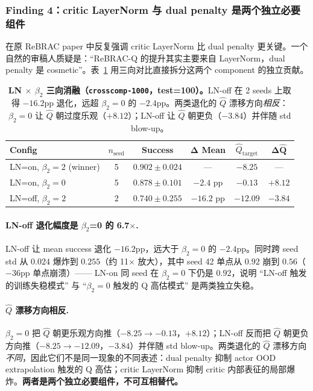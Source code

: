 \subsubsection{Finding 4：critic LayerNorm 与 dual penalty 是两个独立必要组件}
\label{subsubsec:finding_4}

\citet{tarasov2023rebrac} 在原 ReBRAC paper 中反复强调 critic LayerNorm 比 dual penalty 更关键。一个自然的审稿人质疑是：``ReBRAC-Q 的提升其实主要来自 LayerNorm，dual penalty 是 cosmetic''。表~\ref{tab:ln_ablation} 用三向对比直接拆分这两个 component 的独立贡献。

\begin{table}[t]
\centering
\small
\caption{\textbf{LN $\times$ $\beta_2$ 三向消融（\texttt{crosscomp-1000}，test=100）。}LN-off 在 2 seeds 上取得 $-16.2$pp 退化，远超 $\beta_2=0$ 的 $-2.4$pp。两类退化的 $\hat{Q}$ 漂移方向\emph{相反}：$\beta_2=0$ 让 $\hat{Q}$ 朝过度乐观（$+8.12$）；LN-off 让 $\hat{Q}$ 朝更负（$-3.84$）并伴随 std blow-up。}
\label{tab:ln_ablation}
\begin{tabular}{lccccc}
\toprule
\textbf{Config} & \textbf{$n_{\text{seed}}$} & \textbf{Success} & $\boldsymbol{\Delta}$\textbf{ Mean} & \textbf{$\hat{Q}_{\text{target}}$} & $\boldsymbol{\Delta \hat{Q}}$ \\
\midrule
LN=on, $\beta_2=2$ (winner) & 5 & $0.902 \pm 0.024$ & — & $-8.25$ & — \\
LN=on, $\beta_2=0$          & 5 & $0.878 \pm 0.101$ & $-2.4$ pp  & $-0.13$  & $+8.12$ \\
LN=off, $\beta_2=2$         & 2 & $0.740 \pm 0.255$ & $-16.2$ pp & $-12.09$ & $-3.84$ \\
\bottomrule
\end{tabular}
\end{table}

\paragraph{LN-off 退化幅度是 $\beta_2$=0 的 6.7$\times$.}
LN-off 让 mean success 退化 $-16.2$pp，远大于 $\beta_2=0$ 的 $-2.4$pp。同时跨 seed std 从 $0.024$ 爆炸到 $0.255$（约 11$\times$ 放大），其中 seed 42 单点从 $0.92$ 崩到 $0.56$（$-36$pp 单点崩溃）—— LN-on 同 seed 在 $\beta_2=0$ 下仍是 $0.92$，说明 ``LN-off 触发的训练失稳模式'' 与 ``$\beta_2=0$ 触发的 Q 高估模式'' 是两类独立失稳。

\paragraph{$\hat{Q}$ 漂移方向相反.}
$\beta_2=0$ 把 $\hat{Q}$ 朝更乐观方向推（$-8.25 \to -0.13$，$+8.12$）；LN-off 反而把 $\hat{Q}$ 朝更负方向推（$-8.25 \to -12.09$，$-3.84$）并伴随 std blow-up。两类退化的 $\hat{Q}$ 漂移方向\emph{不同}，因此它们不是同一现象的不同表述：dual penalty 抑制 actor OOD extrapolation 触发的 Q 高估；critic LayerNorm 抑制 critic 内部表征的局部爆炸。\textbf{两者是两个独立必要组件，不可互相替代。}


